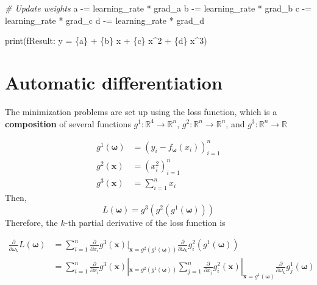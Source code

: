 \documentclass[
]{article}
\newenvironment{Shaded}{}{}
\newcommand{\BuiltInTok}[1]{\textcolor[rgb]{0.00,0.50,0.00}{#1}}
\newcommand{\CommentTok}[1]{\textcolor[rgb]{0.38,0.63,0.69}{\textit{#1}}}
\newcommand{\NormalTok}[1]{#1}
\newcommand{\OperatorTok}[1]{\textcolor[rgb]{0.40,0.40,0.40}{#1}}
\newcommand{\SpecialCharTok}[1]{\textcolor[rgb]{0.25,0.44,0.63}{#1}}
\newcommand{\SpecialStringTok}[1]{\textcolor[rgb]{0.73,0.40,0.53}{#1}}
\newcommand{\1}{\boldsymbol{1}}
\begin{document}
\begin{Shaded}
\begin{Highlighting}[]
    \CommentTok{\# Update weights}
\NormalTok{    a }\OperatorTok{{-}=}\NormalTok{ learning\_rate }\OperatorTok{*}\NormalTok{ grad\_a}
\NormalTok{    b }\OperatorTok{{-}=}\NormalTok{ learning\_rate }\OperatorTok{*}\NormalTok{ grad\_b}
\NormalTok{    c }\OperatorTok{{-}=}\NormalTok{ learning\_rate }\OperatorTok{*}\NormalTok{ grad\_c}
\NormalTok{    d }\OperatorTok{{-}=}\NormalTok{ learning\_rate }\OperatorTok{*}\NormalTok{ grad\_d}

\BuiltInTok{print}\NormalTok{(}\SpecialStringTok{f\textquotesingle{}Result: y = }\SpecialCharTok{\{}\NormalTok{a}\SpecialCharTok{\}}\SpecialStringTok{ + }\SpecialCharTok{\{}\NormalTok{b}\SpecialCharTok{\}}\SpecialStringTok{ x + }\SpecialCharTok{\{}\NormalTok{c}\SpecialCharTok{\}}\SpecialStringTok{ x\^{}2 + }\SpecialCharTok{\{}\NormalTok{d}\SpecialCharTok{\}}\SpecialStringTok{ x\^{}3\textquotesingle{}}\NormalTok{)}
\end{Highlighting}
\end{Shaded}

\hypertarget{automatic-differentiation}{%
\section{Automatic differentiation}\label{automatic-differentiation}}

The minimization problems are set up using the loss function, which is a
\textbf{composition} of several functions
\(g^1: \mathbb{R}^4 \to \mathbb{R}^n\),
\(g^2: \mathbb{R}^n \to \mathbb{R}^n\), and
\(g^3: \mathbb{R}^n \to \mathbb{R}\)

\begin{align*}
    g^1(\boldsymbol{\omega}) &= (y_i - f_{\boldsymbol{\omega}}(x_i))_{i=1}^n
\\
    g^2(\mathbf{x}) &= (x_i^2)_{i=1}^n
\\
    g^3(\mathbf{x}) &= \sum_{i=1}^{n} x_i
\end{align*} Then, \[
L(\boldsymbol{\omega}) = g^3(g^2(g^1(\boldsymbol{\omega})))
\] Therefore, the \(k\)-th partial derivative of the loss function is

\begin{align*}
\frac{\partial}{\partial \omega_k} L(\boldsymbol{\omega}) 
    & = \sum_{i=1}^{n} \frac{\partial }{\partial x_i} g^3(\mathbf{x})|_{\mathbf{x}= g^2(g^1(\boldsymbol{\omega}))} \frac{\partial}{\partial \omega_k}  g^2_i(g^1(\boldsymbol{\omega}))
\\
    & = \sum_{i=1}^{n} \frac{\partial }{\partial x_i} g^3(\mathbf{x})|_{\mathbf{x}= g^2(g^1(\boldsymbol{\omega}))} \sum_{j=1}^{n} \frac{\partial}{\partial x_j}  g^2_i(\mathbf{x})|_{\mathbf{x}= g^1(\boldsymbol{\omega})} \frac{\partial}{\partial \omega_k}  g^1_j(\boldsymbol{\omega})
\end{align*}
\end{document}
